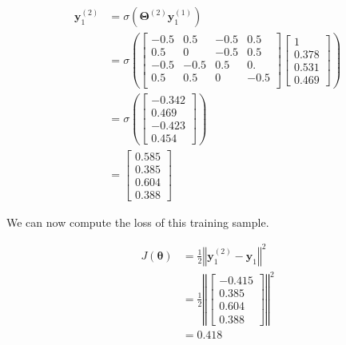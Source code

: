 \documentclass[a4paper, 10pt, twoside]{article}
\begin{document}
\begin{enumerate}[a)]
	      \begin{align*}
		      \bm{y}_1^{(2)}
		       & = \sigma\left(\bm{\Theta}^{(2)}\bm{y}_1^{(1)}\right) \\
		       & = \sigma
		      \left(
		      \begin{bmatrix}
				      -0.5 & 0.5  & -0.5 & 0.5  \\
				      0.5  & 0    & -0.5 & 0.5  \\
				      -0.5 & -0.5 & 0.5  & 0.   \\
				      0.5  & 0.5  & 0    & -0.5 \\
			      \end{bmatrix}
		      \begin{bmatrix}
				      1 \\ 0.378 \\ 0.531 \\ 0.469
			      \end{bmatrix}
		      \right)                                                 \\
		       & = \sigma
		      \left(
		      \begin{bmatrix}
				      -0.342 \\ 0.469 \\ -0.423 \\ 0.454
			      \end{bmatrix}
		      \right)                                                 \\
		       & =
		      \begin{bmatrix}
			      0.585 \\ 0.385 \\ 0.604 \\ 0.388
		      \end{bmatrix}
	      \end{align*}

	      We can now compute the loss of this training sample.

	      \begin{align*}
		      J(\bm{\theta})
		       & = \frac{1}{2} \left\Vert\bm{y}_1^{(2)} - \bm{y}_1\right\Vert^2 \\
		       & = \frac{1}{2}
		      \left\Vert
		      \begin{bmatrix}
			      -0.415 \\ 0.385 \\ 0.604 \\ 0.388
		      \end{bmatrix}
		      \right\Vert^2                                                     \\
		       & = 0.418
	      \end{align*}


\end{enumerate}
\end{document}

